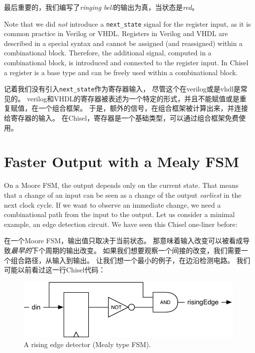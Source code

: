 \documentclass[%
    10pt,
    headinclude, footexclude,
    openright, %
    notitlepage,
    cleardoubleempty,
    headsepline,
    pointlessnumbers,
    bibtotoc, idxtotoc,
    ]{scrbook}
\newcommand{\code}[1]{{\small{\texttt{#1}}}}
\newcommand{\scale}{0.7}
\begin{document}
{\noindent 最后重要的，我们编写了\emph{ringing bell}的输出为真，当状态是\emph{red}。


Note that we did \emph{not} introduce a \code{next\_state} signal for the register input,
as it is common practice in Verilog or VHDL.
Registers in Verilog and VHDL are described in a special syntax and cannot
be assigned (and reassigned) within a combinational block.
Therefore, the additional signal, computed in a combinational block, is
introduced and connected to the register input.
In Chisel a register is a base type and can be freely used within a combinational block.

记着我们没有引入\code{next\_state}作为寄存器输入，
尽管这个在verilog或是vhdl是常见的。
verilog和VHDL的寄存器被表述为一个特定的形式，并且不能赋值或是重复赋值，在一个组合框架。
于是，额外的信号，在组合框架被计算出来，并连接给寄存器的输入。
在Chisel，寄存器是一个基础类型，可以通过组合框架免费使用。

\section{Faster Output with a Mealy FSM}

On a Moore FSM, the output depends only on the current state.
That means that a change of an input can be seen as a change of the
output \emph{earliest} in the next clock cycle.
If we want to observe an immediate change, we need a combinational
path from the input to the output.
Let us consider a minimal example, an edge detection circuit.
We have seen this Chisel one-liner before:

在一个Moore FSM，输出值只取决于当前状态。
那意味着输入改变可以被看成导致\emph{最早的}下个周期的输出改变。
如果我们想要观察一个间接的改变，我们需要一个组合路径，从输入到输出。
让我们想一个最小的例子，在边沿检测电路。
我们可能以前看过这一行Chisel代码：


\begin{figure}
  \centering
  \includegraphics[scale=\scale]{figures/fsm-rising}
  \caption{A rising edge detector (Mealy type FSM).}
  \label{fig:fsm-rising}
\end{figure}

}
\end{document}
